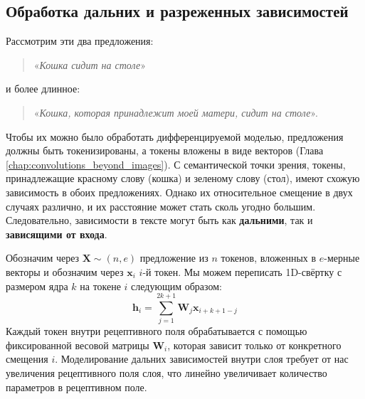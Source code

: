 \subsection{Обработка дальних и разреженных зависимостей}

Рассмотрим эти два предложения: 
%
\begin{quote}
«\textit{{\color{drawred}Кошка} сидит на {\color{drawgreen}столе}}»
\end{quote}
%
и более длинное:
%
\begin{quote}
«\textit{{\color{drawred}Кошка}, которая принадлежит моей матери, сидит на {\color{drawgreen}столе}}».
\end{quote}
%
Чтобы их можно было обработать дифференцируемой моделью, предложения должны быть токенизированы, а токены вложены в виде векторов (Глава \ref{chap:convolutions_beyond_images}). С семантической точки зрения, токены, принадлежащие красному слову ({\color{drawred}кошка}) и зеленому слову ({\color{drawgreen}стол}), имеют схожую зависимость в обоих предложениях. Однако их относительное смещение в двух случаях различно, и их расстояние может стать сколь угодно большим. Следовательно, зависимости в тексте могут быть как \textbf{дальними}, так и \textbf{зависящими от входа}.

Обозначим через $\mathbf{X} \sim (n, e)$ предложение из $n$ токенов, вложенных в $e$-мерные векторы и обозначим через $\mathbf{x}_i$ $i$-й токен. Мы можем переписать 1D-свёртку с размером ядра $k$ на токене $i$ следующим образом:
%
\begin{equation}
\mathbf{h}_i=\sum_{j=1}^{2k+1}\mathbf{W}_j \mathbf{x}_{i+k+1-j}
\label{eq:conv_1d}
\end{equation}
%
Каждый токен внутри рецептивного поля обрабатывается с помощью фиксированной весовой матрицы $\mathbf{W}_i$, которая зависит только от конкретного смещения $i$. Моделирование дальних зависимостей внутри слоя требует от нас увеличения рецептивного поля слоя, что линейно увеличивает количество параметров в рецептивном поле. 

